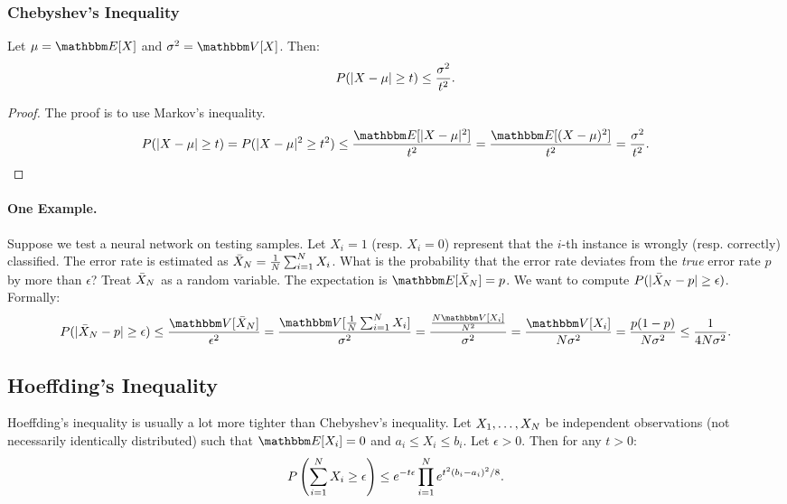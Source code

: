     \subsubsection{Chebyshev's Inequality}
    Let $\mu = \E[X]$ and $\sigma^2 = \Var[X]$.
    Then:
        \begin{equation}
            P(| X - \mu | \ge t) \le \frac{\sigma^2}{t^2}.
        \end{equation}
    \begin{proof}
        The proof is to use Markov's inequality.
        \begin{equation}
            P(\Abs{X - \mu} \ge t) = P(\Abs{X - \mu}^2 \ge t^2) \le \frac{\E[\Abs{X - \mu}^2]}{t^2} =  \frac{\E[(X - \mu)^2]}{t^2} = \frac{\sigma^2}{t^2}.
        \end{equation}
    \end{proof}
    
    \paragraph{One Example.}
    Suppose we test a neural network on \ndata testing samples.
    Let $X_i=1$ (resp. $X_i = 0$) represent that the $i$-th instance is wrongly (resp. correctly) classified.
    The error rate is estimated as $\bar{X}_N = \frac{1}{N} \sum_{i=1}^{N}{X_i}$.
    What is the probability that the error rate deviates from the \emph{true} error rate $p$ by more than $\epsilon$?
    Treat $\bar{X}_N$ as a random variable.
    The expectation is $\E[\bar{X}_\ndata] = p$.
    We want to compute $P(| \bar{X}_N - p | \ge \epsilon)$.
    Formally:
        \begin{equation}
            P(\Abs{\bar{X}_\ndata - p} \ge \epsilon) \le \frac{\Var[\bar{X}_\ndata]}{\epsilon^2} = \frac{\Var[\frac{1}{\ndata} \sum_{i=1}^{\ndata}{X_i}]}{\sigma^2} = \frac{\frac{\ndata \Var[X_i]}{\ndata^2}}{\sigma^2} = \frac{\Var[X_i]}{\ndata \sigma^2} = \frac{p (1 - p)}{N \sigma^2} \le \frac{1}{4\ndata \sigma^2}.
        \end{equation}
    
    
    \subsection{Hoeffding's Inequality}
        Hoeffding's inequality is usually a lot more tighter than Chebyshev's inequality.
        Let $X_1, \ldots, X_N$ be independent observations (not necessarily identically distributed) such that $\E[X_i] = 0$ and $a_i \le X_i \le b_i$.
        Let $\epsilon > 0$.
        Then for any $t > 0$:
            \begin{equation}
                P\left( \sum_{i=1}^{N}{X_i} \ge \epsilon \right) \le e^{-t\epsilon} \prod_{i=1}^{N}{e^{t^2(b_i-a_i)^2/8} }.
            \end{equation}
        
    